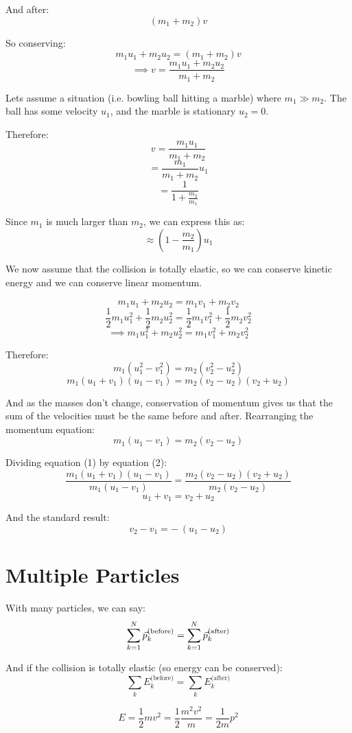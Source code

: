 And after:
\[
    (m_1 + m_2)v
\]

So conserving:
\[
    m_1 u_1 + m_2 u_2 = (m_1 + m_2)v
\]
\[
    \implies v = \frac{m_1 u_1 + m_2 u_2}{m_1 + m_2}
\]

Lets assume a situation (i.e. bowling ball hitting a marble) where $m_1 \gg m_2$. The ball has some velocity $u_1$, and the marble is stationary $u_2 = 0$.

Therefore:
\[
    v = \frac{m_1 u_1}{m_1 + m_2}
\]
\[
    = \frac{m_1}{m_1 + m_2} u_1
\]
\[
    = \frac{1}{1 + \frac{m_2}{m_1}}
\]


Since $m_1$ is much larger than $m_2$, we can express this as:
\[
    \approx \left(1 - \frac{m_2}{m_1}\right) u_1
\]


We now assume that the collision is totally elastic, so we can conserve kinetic energy and we can conserve linear momentum.

\[
    m_1 u_1 + m_2 u_2 = m_1 v_1 + m_2 v_2
\]
\[
    \frac{1}{2}m_1 u_1^2 + \frac{1}{2} m_2 u_2^2 = \frac{1}{2}m_1 v_1^2 + \frac{1}{2}m_2 v_2^2
\]
\[
    \implies m_1 u_1^2 + m_2 u_2^2 = m_1 v_1^2 + m_2 v_2^2
\]

Therefore:
\[
    m_1 (u_1^2 - v_1^2) = m_2(v_2^2 - u_2^2)
\]
\[
    m_1 (u_1 + v_1)(u_1 - v_1) = m_2(v_2 - u_2)(v_2 + u_2) \tag{1}
\]

And as the masses don't change, conservation of momentum gives us that the sum of the velocities must be the same before and after. Rearranging the momentum equation:
\[
    m_1(u_1 - v_1) = m_2(v_2 - u_2) \tag{2}
\]

Dividing equation (1) by equation (2):
\[
    \frac{m_1 (u_1 + v_1)(u_1 - v_1)}{m_1(u_1 - v_1)} = \frac{m_2(v_2 - u_2)(v_2 + u_2)}{m_2(v_2 - u_2)}
\]
\[
    u_1 + v_1 = v_2 + u_2
\]

And the standard result:
\[
    v_2 - v_1 = -\ (u_1 - u_2)
\]

\section{Multiple Particles}
With many particles, we can say:
\[
    \sum_{k=1}^{N} \vec{p}_k^\text{(before)} = \sum_{k=1}^{N} \vec{p}_k^\text{(after)}
\]

And if the collision is totally elastic (so energy can be conserved):
\[
    \sum_k E_k^\text{(before)} = \sum_{k} E_k^\text{(after)}
\]

\[
    E = \frac{1}{2}mv^2 = \frac{1}{2} \frac{m^2v^2}{m} = \frac{1}{2m} p^2
\]

